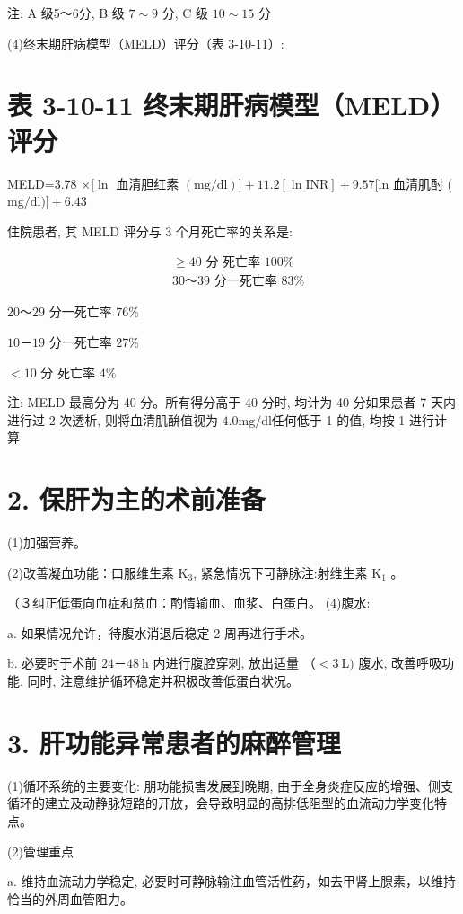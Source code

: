 \documentclass[10pt]{article}
\begin{document}
注: A 级5～6分, B 级 $7 \sim 9$ 分, C 级 $10 \sim 15$ 分

(4)终末期肝病模型（MELD）评分（表 3-10-11）:

\section*{表 3-10-11 终末期肝病模型（MELD）评分}
MELD=3.78 $\times[\ln$ 血清胆红素 $(\mathrm{mg} / \mathrm{dl})]+11.2[\ln \mathrm{INR}]+9.57[\mathrm{ln}$ 血清肌酎 ( $\mathrm{mg} / \mathrm{dl})]+6.43$

住院患者, 其 MELD 评分与 3 个月死亡率的关系是:

\[
\begin{aligned}
& \geqslant 40 \text { 分 死亡率 } 100 \% \\
& 30 ～ 39 \text { 分一死亡率 } 83 \%
\end{aligned}
\]

$20 ～ 29$ 分一死亡率 $76 \%$

$10 － 19$ 分一死亡率 $27 \%$

$<10$ 分 死亡率 $4 \%$

注: MELD 最高分为 40 分。所有得分高于 40 分时, 均计为 40 分如果患者 7 天内进行过 2 次透析, 则将血清肌䣲值视为 $4.0 \mathrm{mg} / \mathrm{dl}$任何低于 1 的值, 均按 1 进行计算

\section*{2. 保肝为主的术前准备}
(1)加强营养。

(2)改善凝血功能：口服维生素 $\mathrm{K}_{3}$, 紧急情况下可静脉注:射维生素 $\mathrm{K}_{1}$ 。

（３纠正低蛋向血症和贫血：酌情输血、血浆、白蛋白。 (4)腹水:

a. 如果情况允许，待腹水消退后稳定 2 周再进行手术。

b. 必要时于术前 $24 － 48 \mathrm{~h}$ 内进行腹腔穿刺, 放出适量 $（<3 \mathrm{~L})$ 腹水, 改善呼吸功能, 同时, 注意维护循环稳定并积极改善低蛋白状况。

\section*{3. 肝功能异常患者的麻醉管理}
(1)循环系统的主要变化: 朋功能损害发展到晚期, 由于全身炎症反应的增强、侧支循环的建立及动静脉短路的开放，会导致明显的高排低阻型的血流动力学变化特点。

(2)管理重点

a. 维持血流动力学稳定, 必要时可静脉输注血管活性药，如去甲肾上腺素，以维持恰当的外周血管阻力。
\end{document}

